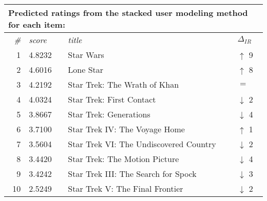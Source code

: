 \begin{table}[h]
  \begin{tabular*}{0.9\textwidth}{ r l p{8.5cm} l }
    \multicolumn{4}{l}{Predicted ratings from the stacked user modeling method for each item:}\\
    \toprule
    \emph{\#} & \emph{score} & \emph{title} & $\Delta_{IR}$\\
    \midrule
    1 & 4.8232 & Star Wars                              & \color{green} $\uparrow$ 9 \\
    2 & 4.6016 & Lone Star                              & \color{green} $\uparrow$ 8 \\
    3 & 4.2192 & Star Trek: The Wrath of Khan           & \color{black} $=$ \\
    4 & 4.0324 & Star Trek: First Contact               & \color{red} $\downarrow$ 2 \\
    5 & 3.8667 & Star Trek: Generations                 & \color{red} $\downarrow$ 4 \\
    6 & 3.7100 & Star Trek IV: The Voyage Home          & \color{green} $\uparrow$ 1 \\
    7 & 3.5604 & Star Trek VI: The Undiscovered Country & \color{red} $\downarrow$ 2 \\
    8 & 3.4420 & Star Trek: The Motion Picture          & \color{red} $\downarrow$ 4 \\
    9 & 3.4242 & Star Trek III: The Search for Spock    & \color{red} $\downarrow$ 3 \\
    10& 2.5249 & Star Trek V: The Final Frontier        & \color{red} $\downarrow$ 2 \\
    \bottomrule
  \end{tabular*}

  \vspace{1em} 


\end{table}
